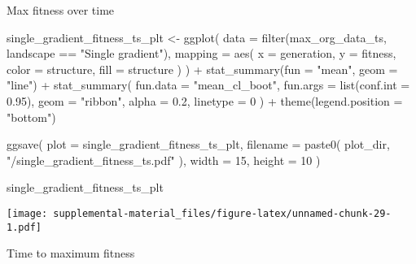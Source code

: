 \documentclass[
]{book}
\newenvironment{Shaded}{\begin{snugshade}}{\end{snugshade}}
\newcommand{\AttributeTok}[1]{\textcolor[rgb]{0.77,0.63,0.00}{#1}}
\newcommand{\DecValTok}[1]{\textcolor[rgb]{0.00,0.00,0.81}{#1}}
\newcommand{\FloatTok}[1]{\textcolor[rgb]{0.00,0.00,0.81}{#1}}
\newcommand{\FunctionTok}[1]{\textcolor[rgb]{0.00,0.00,0.00}{#1}}
\newcommand{\NormalTok}[1]{#1}
\newcommand{\OtherTok}[1]{\textcolor[rgb]{0.56,0.35,0.01}{#1}}
\newcommand{\SpecialCharTok}[1]{\textcolor[rgb]{0.00,0.00,0.00}{#1}}
\newcommand{\StringTok}[1]{\textcolor[rgb]{0.31,0.60,0.02}{#1}}
\begin{document}
Max fitness over time

\begin{Shaded}
\begin{Highlighting}[]
\NormalTok{single\_gradient\_fitness\_ts\_plt }\OtherTok{\textless{}{-}} \FunctionTok{ggplot}\NormalTok{(}
    \AttributeTok{data =} \FunctionTok{filter}\NormalTok{(max\_org\_data\_ts, landscape }\SpecialCharTok{==} \StringTok{"Single gradient"}\NormalTok{),}
    \AttributeTok{mapping =} \FunctionTok{aes}\NormalTok{(}
      \AttributeTok{x =}\NormalTok{ generation,}
      \AttributeTok{y =}\NormalTok{ fitness,}
      \AttributeTok{color =}\NormalTok{ structure,}
      \AttributeTok{fill =}\NormalTok{ structure}
\NormalTok{    )}
\NormalTok{  ) }\SpecialCharTok{+}
  \FunctionTok{stat\_summary}\NormalTok{(}\AttributeTok{fun =} \StringTok{"mean"}\NormalTok{, }\AttributeTok{geom =} \StringTok{"line"}\NormalTok{) }\SpecialCharTok{+}
  \FunctionTok{stat\_summary}\NormalTok{(}
    \AttributeTok{fun.data =} \StringTok{"mean\_cl\_boot"}\NormalTok{,}
    \AttributeTok{fun.args =} \FunctionTok{list}\NormalTok{(}\AttributeTok{conf.int =} \FloatTok{0.95}\NormalTok{),}
    \AttributeTok{geom =} \StringTok{"ribbon"}\NormalTok{,}
    \AttributeTok{alpha =} \FloatTok{0.2}\NormalTok{,}
    \AttributeTok{linetype =} \DecValTok{0}
\NormalTok{  ) }\SpecialCharTok{+}
  \FunctionTok{theme}\NormalTok{(}\AttributeTok{legend.position =} \StringTok{"bottom"}\NormalTok{)}

\FunctionTok{ggsave}\NormalTok{(}
  \AttributeTok{plot =}\NormalTok{ single\_gradient\_fitness\_ts\_plt,}
  \AttributeTok{filename =} \FunctionTok{paste0}\NormalTok{(}
\NormalTok{    plot\_dir,}
    \StringTok{"/single\_gradient\_fitness\_ts.pdf"}
\NormalTok{  ),}
  \AttributeTok{width =} \DecValTok{15}\NormalTok{,}
  \AttributeTok{height =} \DecValTok{10}
\NormalTok{)}

\NormalTok{single\_gradient\_fitness\_ts\_plt}
\end{Highlighting}
\end{Shaded}

\texttt{[image: supplemental-material\_files/figure-latex/unnamed-chunk-29-1.pdf]}

Time to maximum fitness
\end{document}
